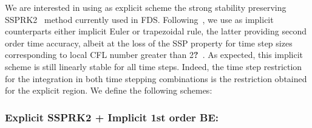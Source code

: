 \documentclass[12pt]{article}
\begin{document}
We are interested in using as explicit scheme the strong stability preserving SSPRK2~\cite{Gottlieb:2001} method currently used in FDS.
Following~\cite{May:2014}, we use as implicit counterparts either implicit Euler or trapezoidal rule, the latter providing second order time accuracy, albeit at the loss of the SSP property for time step sizes corresponding to local CFL number greater than 2\textbf{?}~\cite{Ketcheson:2009,Gottlieb:2009}. As expected, this implicit scheme is still linearly stable for all time steps. Indeed, the time step restriction for the integration in both time stepping combinations is the restriction obtained for the explicit region.
We define the following schemes:

\subsubsection*{Explicit SSPRK2 + Implicit 1st order BE:}
\end{document}

